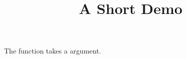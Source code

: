 \documentclass[article]{jss}
\title{A Short Demo}
\begin{document}
The  function takes a  argument.
\end{document}
